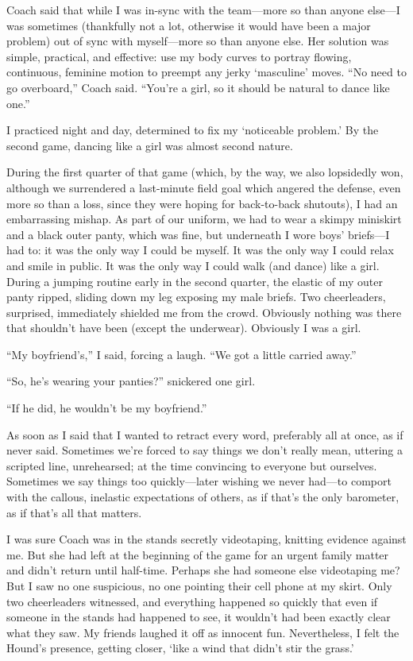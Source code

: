 Coach said that while I was in-sync with the team---more so than anyone
else---I was sometimes (thankfully not a lot, otherwise it would have
been a major problem) out of sync with myself---more so than anyone
else. Her solution was simple, practical, and effective: use my body
curves to portray flowing, continuous, feminine motion to preempt any
jerky `masculine' moves. ``No need to go overboard,'' Coach said.
``You're a girl, so it should be natural to dance like one.''

I practiced night and day, determined to fix my `noticeable problem.' By
the second game, dancing like a girl was almost second nature.

During the first quarter of that game (which, by the way, we also
lopsidedly won, although we surrendered a last-minute field goal which
angered the defense, even more so than a loss, since they were hoping
for back-to-back shutouts), I had an embarrassing mishap. As part of our
uniform, we had to wear a skimpy miniskirt and a black outer panty,
which was fine, but underneath I wore boys' briefs---I had to: it was
the only way I could be myself. It was the only way I could relax and
smile in public. It was the only way I could walk (and dance) like a
girl. During a jumping routine early in the second quarter, the elastic
of my outer panty ripped, sliding down my leg exposing my male briefs.
Two cheerleaders, surprised, immediately shielded me from the crowd.
Obviously nothing was there that shouldn't have been (except the
underwear). Obviously I was a girl.

``My boyfriend's,'' I said, forcing a laugh. ``We got a little carried
away.''

``So, he's wearing your panties?'' snickered one girl.

``If he did, he wouldn't be my boyfriend.''

As soon as I said that I wanted to retract every word, preferably all at
once, as if never said. Sometimes we're forced to say things we don't
really mean, uttering a scripted line, unrehearsed; at the time
convincing to everyone but ourselves. Sometimes we say things too
quickly---later wishing we never had---to comport with the callous,
inelastic expectations of others, as if that's the only barometer, as if
that's all that matters.

I was sure Coach was in the stands secretly videotaping, knitting
evidence against me. But she had left at the beginning of the game for
an urgent family matter and didn't return until half-time. Perhaps she
had someone else videotaping me? But I saw no one suspicious, no one
pointing their cell phone at my skirt. Only two cheerleaders witnessed,
and everything happened so quickly that even if someone in the stands
had happened to see, it wouldn't had been exactly clear what they saw.
My friends laughed it off as innocent fun. Nevertheless, I felt the
Hound's presence, getting closer, `like a wind that didn't stir the
grass.'

